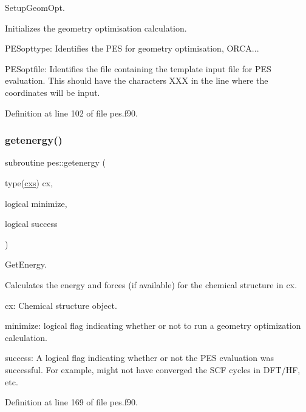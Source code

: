 Setup\+Geom\+Opt. 

Initializes the geometry optimisation calculation.


\begin{DoxyItemize}
\item P\+E\+Sopttype\+: Identifies the P\+ES for geometry optimisation, \textquotesingle{}O\+R\+CA\textquotesingle{}...
\item P\+E\+Soptfile\+: Identifies the file containing the template input file for P\+ES evaluation. This should have the characters \textquotesingle{}X\+XX\textquotesingle{} in the line where the coordinates will be input. 
\end{DoxyItemize}

Definition at line 102 of file pes.\+f90.

\mbox{\label{namespacepes_a91b500ad9eae04b998b48e3ede7b1ad3}} 
\subsubsection{\texorpdfstring{getenergy()}{getenergy()}}
{\footnotesize\ttfamily subroutine pes\+::getenergy (\begin{DoxyParamCaption}\item[{type(\mbox{\hyperlink{structchemstr_1_1cxs}{cxs}})}]{cx,  }\item[{logical}]{minimize,  }\item[{logical}]{success }\end{DoxyParamCaption})}



Get\+Energy. 

Calculates the energy and forces (if available) for the chemical structure in cx.


\begin{DoxyItemize}
\item cx\+: Chemical structure object.
\item minimize\+: logical flag indicating whether or not to run a geometry optimization calculation.
\item success\+: A logical flag indicating whether or not the P\+ES evaluation was successful. For example, might not have converged the S\+CF cycles in D\+F\+T/\+HF, etc. 
\end{DoxyItemize}

Definition at line 169 of file pes.\+f90.

